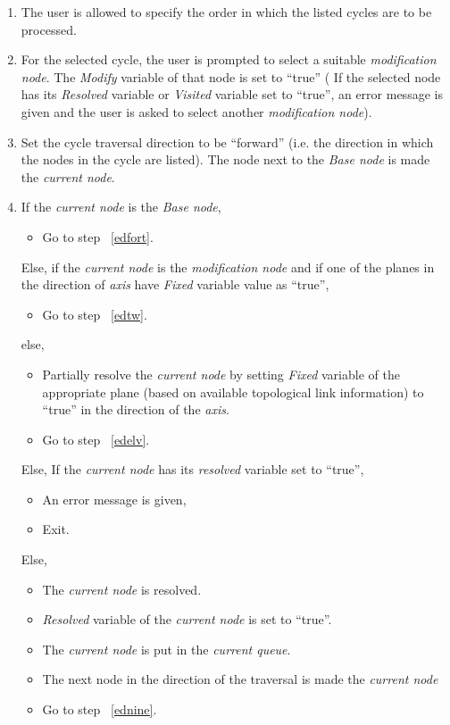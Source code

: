 \begin{enumerate}
	\item
	The user is allowed to specify the order in which the listed cycles are
	to be processed.

	\item
	For the selected cycle, the user is prompted to select a suitable 
	{\em modification
	node}. The {\em Modify} variable of that node is set to ``true'' (
	If the selected node has its {\em Resolved} variable or {\em Visited}
	variable set to ``true'', an error message is given and the user is asked
	to select another {\em modification node}).

	\item
	\label{edeight}
	Set the cycle traversal direction to be ``forward'' (i.e.
	the direction in which the nodes in the cycle are listed). The node next
	to the {\em Base node} is made the {\em current node}.

	\item
	\label{ednine}
	If the {\em current node} is the {\em Base node}, 
		\begin{itemize}
		\item
		Go to step ~\ref{edfort}.
		\end{itemize}
	Else, if the {\em current node} is the {\em modification node} and
		if one of the planes in the direction of {\em axis} have {\em Fixed}
		variable value as ``true'',
		\begin{itemize}
		\item
		Go to step ~\ref{edtw}.
		\end{itemize}
		else,
		\begin{itemize}
		\item
		Partially resolve the {\em current node} by setting {\em Fixed} variable
		of the appropriate plane (based on available topological link 
		information) to ``true'' in the direction of the {\em axis}.
		\item
		Go to step ~\ref{edelv}.
		\end{itemize}
	Else,
		If the {\em current node} has its {\em resolved} variable set to 
		``true'', 
		\begin{itemize}
			\item
			An error message is given,
			\item
			Exit.
		\end{itemize}
		Else, 
		\begin{itemize}
		\item
		The {\em current node} is resolved.
		\item
		{\em Resolved} variable of the {\em current node} is set to ``true''.
		\item
		The {\em current node} is put in the {\em current queue}.
		\item
		The next node in the direction of the traversal is made the
		{\em current node} 
		\item
		Go to step ~\ref{ednine}.
		\end{itemize}


\end{enumerate}
